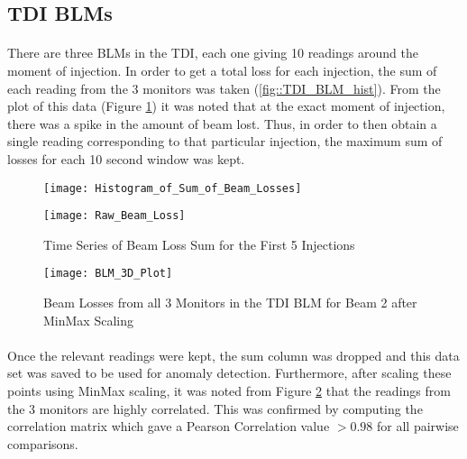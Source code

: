 \subsection{\acs{TDI} \acs{BLM}s}
\paragraph{ }There are three \acs{BLM}s in the \acs{TDI}, each one giving 10 readings around the moment of injection. In order to get a total loss for each injection, the sum of each reading from the 3 monitors was taken (\ref{fig::TDI_BLM_hist}). From the plot of this data (Figure \ref{fig::Raw_TDI_BLM}) it was noted that at the exact moment of injection, there was a spike in the amount of beam lost. Thus, in order to then obtain a single reading corresponding to that particular injection, the maximum sum of losses for each 10 second window was kept. 

\begin{figure}[!t]
	\begin{minipage}[b]{0.475\linewidth}
		\centering
		\texttt{[image: Histogram\_of\_Sum\_of\_Beam\_Losses]}
		\caption[BLM Histogram]{Histogram of Sum of Losses for Beam 1}
		\label{fig::TDI_BLM_hist}
	\end{minipage}	
	\hspace{0.25cm}
	\begin{minipage}[b]{0.475\linewidth}
		\centering
		\texttt{[image: Raw\_Beam\_Loss]}
		\caption[BLM Time Series]{Time Series of Beam Loss Sum for the First 5 Injections}
		\label{fig::Raw_TDI_BLM}
	\end{minipage}	
\end{figure}

\begin{figure}[b]
	\centering
	\texttt{[image: BLM\_3D\_Plot]}
	\caption[BLM Correlation Plot]{Beam Losses from all 3 Monitors in the TDI BLM for Beam 2 after MinMax Scaling}
	\label{fig::TDI_BLM_3D}
\end{figure}  

\paragraph{ }Once the relevant readings were kept, the sum column was dropped and this data set was saved to be used for anomaly detection. Furthermore, after scaling these points using MinMax scaling, it was noted from Figure \ref{fig::TDI_BLM_3D} that the readings from the 3 monitors are highly correlated. This was confirmed by computing the correlation matrix which gave a Pearson Correlation value $> 0.98$ for all pairwise comparisons.

